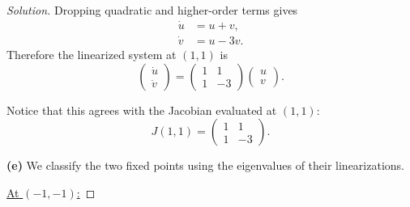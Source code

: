 \documentclass[12pt]{amsart}
\theoremstyle{conjecture}
\theoremstyle{definition}
\theoremstyle{question}
\theoremstyle{theorem}
\newenvironment{solution}
{\begin{proof}[Solution]}
{\end{proof}}
\begin{document}
\begin{solution}
        Dropping quadratic and higher-order terms gives
        \[
            \boxed{
                \begin{aligned}
                    \dot{u}&=u+v,\\
                    \dot{v}&=u-3v.
                \end{aligned}}
        \]
        Therefore the linearized system at $(1,1)$ is
        \[
            \boxed{
                \begin{pmatrix}
                    \dot{u}\\
                    \dot{v}
                \end{pmatrix}
                =
                \begin{pmatrix}
                    1 & 1\\
                    1 & -3
                \end{pmatrix}
                \begin{pmatrix}
                    u\\
                    v
                \end{pmatrix}.}
        \]

        Notice that this agrees with the Jacobian evaluated at $(1,1)$:
        \[
            J(1,1)
            =
            \begin{pmatrix}
                1 & 1\\
                1 & -3
            \end{pmatrix}.
        \]

        \bigskip

        \textbf{(e)} We classify the two fixed points using the eigenvalues
        of their linearizations.

        \medskip
        \underline{At $(-1,-1)$:}


\end{solution}
\end{document}
